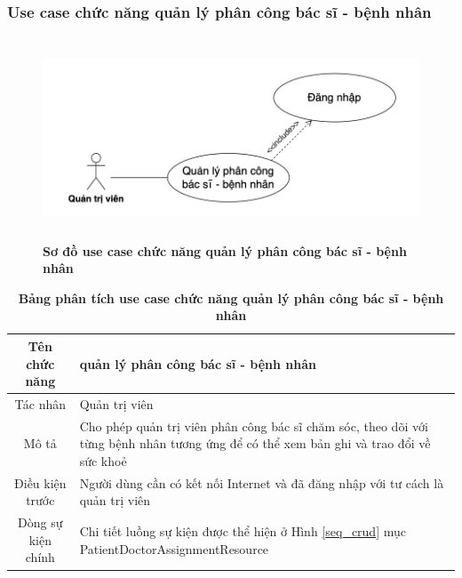 \subsubsection{Use case chức năng quản lý phân công bác sĩ - bệnh nhân}
  \begin{figure}[H]
    \centering
    \includegraphics[width=15cm,height=6cm]{Images/use_case/use_case_assign_doctor.png}
    \caption[Sơ đồ use case chức năng quản lý phân công bác sĩ - bệnh nhân]{\bfseries \fontsize{12pt}{0pt}
    \selectfont Sơ đồ use case chức năng quản lý phân công bác sĩ - bệnh nhân}
    \label{use_case_assign_doctor} %
  \end{figure}

  \begin{table}[H]
    \caption{\bfseries \fontsize{12pt}{0pt}\selectfont Bảng phân tích use case chức năng quản lý phân công bác sĩ - bệnh nhân}
    \centering
    \begin{tabularx}{0.9\textwidth}{|c|X|}
      \hline
      \textbf{Tên chức năng} & \textbf{quản lý phân công bác sĩ - bệnh nhân} \\
      \hline
      Tác nhân & Quản trị viên \\
      \hline
      Mô tả & Cho phép quản trị viên phân công bác sĩ chăm sóc, theo dõi với từng bệnh nhân tương ứng để có thể xem bản ghi
      và trao đổi về sức khoẻ \\
      \hline
      Điều kiện trước & Người dùng cần có kết nối Internet và đã đăng nhập với tư cách là quản trị viên \\
      \hline
      Dòng sự kiện chính & 
        Chi tiết luồng sự kiện được thể hiện ở Hình \ref{seq_crud} mục PatientDoctorAssignmentResource\\
      \hline
    \end{tabularx}
  \end{table}

